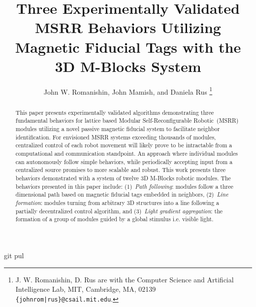 \documentclass[letterpaper, 10 pt, conference]{ieeeconf}
\title{Three Experimentally Validated MSRR Behaviors Utilizing Magnetic Fiducial Tags with the 3D M-Blocks System}
\author{John W. Romanishin, John Mamish, and Daniela Rus
  \thanks{J. W. Romanishin, D. Rus are with the Computer Science
    and Artificial Intelligence Lab, MIT, Cambridge, MA, 02139
    {\tt\small \{johnrom|rus\}@csail.mit.edu}.}
}
\begin{document}
	
\newcommand{\tagName}{MFTag}
\newcommand{\TagName}{MFTag}git pul
\newcommand{\tagNamePlural}{MFTags}
\newcommand{\TagNamePlural}{MFTags}


\captionsetup[figure]{labelfont=small, textfont=small}
\captionsetup[table]{labelfont=small, textfont=small}

\maketitle
\thispagestyle{empty}
\pagestyle{empty}

\begin{abstract}

This paper presents experimentally validated algorithms demonstrating three fundamental behaviors for lattice based Modular Self-Reconfigurable Robotic~(MSRR) modules utilizing a novel passive magnetic fiducial system to facilitate neighbor identification. For envisioned MSRR systems exceeding thousands of modules, centralized control of each robot movement will likely prove to be intractable from a computational and communication standpoint. An approach where individual modules can autonomously follow simple behaviors, while periodically accepting input from a centralized source promises to more scalable and robust. This work presents three behaviors demonstrated with a system of twelve 3D M-Blocks robotic modules. The behaviors presented in this paper include: (1)~\textit{Path following}: modules follow a three dimensional path based on magnetic fiducial tags embedded in neighbors, (2)~\textit{Line formation}: modules turning from arbitrary 3D structures into a line following a partially decentralized control algorithm, and (3)~\textit{Light gradient aggregation}: the formation of a group of modules guided by a global stimulus i.e. visible light.

\end{abstract}
\end{document}
